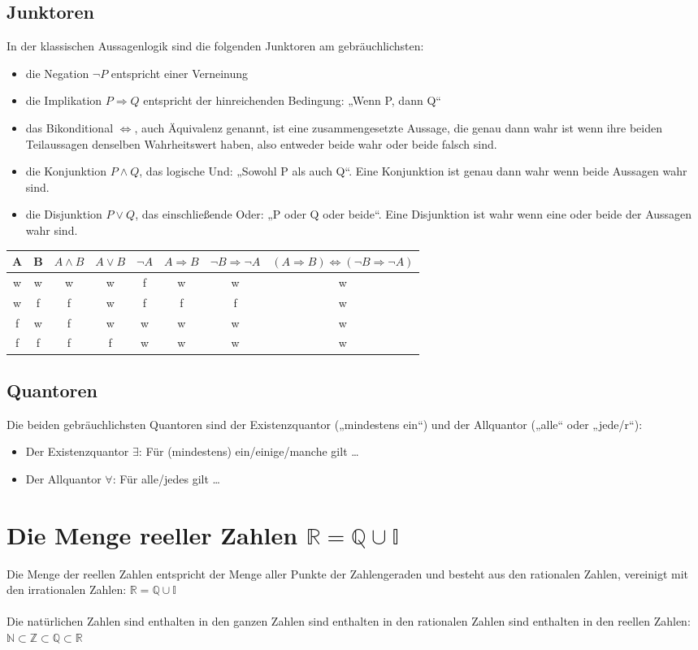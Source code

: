 \documentclass[a4paper]{article}
\begin{document}
\subsection{Junktoren}
In der klassischen Aussagenlogik sind die folgenden Junktoren am gebräuchlichsten:
\begin{itemize}
\item die Negation $\neg P$ entspricht einer Verneinung
\item die Implikation $P \Rightarrow Q$ entspricht der hinreichenden Bedingung: „Wenn P, dann Q“
\item das Bikonditional $\Leftrightarrow$, auch Äquivalenz genannt, ist eine zusammengesetzte Aussage, die genau dann wahr ist wenn ihre beiden Teilaussagen denselben Wahrheitswert haben, also entweder beide wahr oder beide falsch sind.
\item die Konjunktion $P \land Q$, das logische Und: „Sowohl P als auch Q“. Eine Konjunktion ist genau dann wahr wenn beide Aussagen wahr sind.
\item die Disjunktion $P \lor Q$, das einschließende Oder: „P oder Q oder beide“. Eine Disjunktion ist wahr wenn eine oder beide der Aussagen wahr sind.
\end{itemize}
\begin{tabular}{c c | c c c c c c}
A & B & $A \land B$ & $A \lor B$ & $\neg A$ & $A \Rightarrow B$ & $\neg B \Rightarrow \neg A$ & $(A \Rightarrow B) \Leftrightarrow (\neg B \Rightarrow \neg A)$ \\
\hline
w & w & w & w & f & w & w & w \\
w & f & f & w & f & f & f & w \\
f & w & f & w & w & w & w & w \\
f & f & f & f & w & w & w & w \\
\hline
\end{tabular}
\subsection{Quantoren}
Die beiden gebräuchlichsten Quantoren sind der Existenzquantor („mindestens ein“) und der Allquantor („alle“ oder „jede/r“):
\begin{itemize}
\item Der Existenzquantor $\exists$: Für (mindestens) ein/einige/manche gilt \dots
\item Der Allquantor $\forall$: Für alle/jedes gilt \dots
\end{itemize}

\section{Die Menge reeller Zahlen $\mathbb{R} = \mathbb{Q} \cup \mathbb{I}$}
Die Menge der reellen Zahlen entspricht der Menge aller Punkte der Zahlengeraden und besteht aus den rationalen Zahlen, vereinigt mit den irrationalen Zahlen: $\mathbb{R} = \mathbb{Q} \cup \mathbb{I}$ \\\\
Die natürlichen Zahlen sind enthalten in den ganzen Zahlen sind enthalten in den rationalen Zahlen sind enthalten in den reellen Zahlen: $\mathbb{N} \subset \mathbb{Z} \subset \mathbb{Q} \subset \mathbb{R}$
\end{document}
